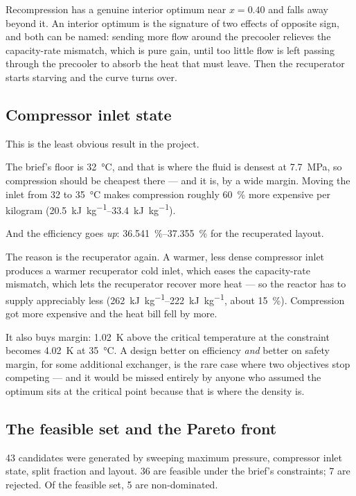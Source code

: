 Recompression has a genuine interior optimum near $x = 0.40$ and falls
away beyond it. An interior optimum is the signature of two effects of
opposite sign, and both can be named: sending more flow around the
precooler relieves the capacity-rate mismatch, which is pure gain, until
too little flow is left passing through the precooler to absorb the heat
that must leave. Then the recuperator starts starving and the curve
turns over.

\subsection{Compressor inlet state}

This is the least obvious result in the project.

The brief's floor is \SI{32}{\celsius}, and that is where the fluid is
densest at \SI{7.7}{\mega\pascal}, so compression should be cheapest
there --- and it is, by a wide margin. Moving the inlet from \num{32} to
\SI{35}{\celsius} makes compression roughly \SI{60}{\percent} more
expensive per kilogram (\SIrange{20.5}{33.4}{\kilo\joule\per\kilogram}).

And the efficiency goes \emph{up}: \SIrange{36.541}{37.355}{\percent}
for the recuperated layout.

The reason is the recuperator again. A warmer, less dense compressor
inlet produces a warmer recuperator cold inlet, which eases the
capacity-rate mismatch, which lets the recuperator recover more heat ---
so the reactor has to supply appreciably less
(\SIrange{262}{222}{\kilo\joule\per\kilogram}, about \SI{15}{\percent}).
Compression got more expensive and the heat bill fell by more.

It also buys margin: \SI{1.02}{\kelvin} above the critical temperature
at the constraint becomes \SI{4.02}{\kelvin} at \SI{35}{\celsius}. A
design better on efficiency \emph{and} better on safety margin, for
some additional exchanger, is the rare case where two objectives stop
competing --- and it would be missed entirely by anyone who assumed the
optimum sits at the critical point because that is where the density is.

\subsection{The feasible set and the Pareto front}

\num{43} candidates were generated by sweeping maximum pressure,
compressor inlet state, split fraction and layout. \num{36} are
feasible under the brief's constraints; \num{7} are rejected. Of the
feasible set, \num{5} are non-dominated.

